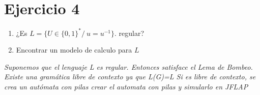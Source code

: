 \documentclass{article}
\begin{document}
        \newpage


        \section*{Ejercicio 4}
        \begin{enumerate}
            \item ¿Es $L = \{ U \in \{0, 1\}^* /\  u=u^{-1} \}$. regular? 
            \item Encontrar un modelo de calculo para $L$ 
        \end{enumerate}

        \textit{
            Suponemos que el lenguaje L es regular.
            Entonces satisface el Lema de Bombeo.
            Existe una gramática libre de contexto ya que L(G)=L
            Si es libre de contexto, se crea un autómata con pilas
            crear el automata con pilas y simularlo en JFLAP
        }

    
\end{document}

